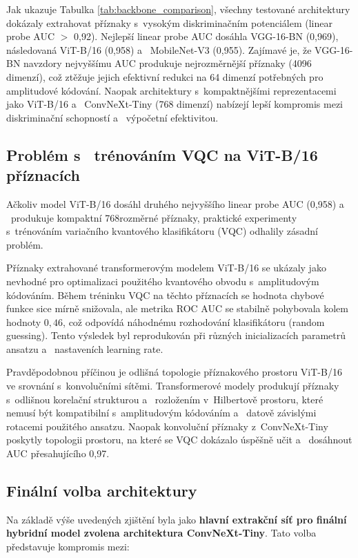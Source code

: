 \documentclass[12pt, a4paper]{report}
\begin{document}
Jak ukazuje Tabulka \ref{tab:backbone_comparison}, všechny testované architektury dokázaly extrahovat příznaky s~vysokým diskriminačním potenciálem (linear probe AUC $>$ 0,92). Nejlepší linear probe AUC dosáhla VGG-16-BN (0,969), následovaná ViT-B/16 (0,958) a ~MobileNet-V3 (0,955). Zajímavé je, že VGG-16-BN navzdory nejvyššímu AUC produkuje nejrozměrnější příznaky (4096 dimenzí), což ztěžuje jejich efektivní redukci na 64 dimenzí potřebných pro amplitudové kódování. Naopak architektury s~kompaktnějšími reprezentacemi jako ViT-B/16 a ~ConvNeXt-Tiny (768 dimenzí) nabízejí lepší kompromis mezi diskriminační schopností a ~výpočetní efektivitou.

\subsection{Problém s ~trénováním VQC na ViT-B/16 příznacích} \label{subsec:vit_vqc_failure}

Ačkoliv model ViT-B/16 dosáhl druhého nejvyššího linear probe AUC (0,958) a ~produkuje kompaktní 768rozměrné příznaky, praktické experimenty s~trénováním variačního kvantového klasifikátoru (VQC) odhalily zásadní problém.

Příznaky extrahované transformerovým modelem ViT-B/16 se ukázaly jako nevhodné pro optimalizaci použitého kvantového obvodu s~amplitudovým kódováním. Během tréninku VQC na těchto příznacích se hodnota chybové funkce sice mírně snižovala, ale metrika ROC AUC se stabilně pohybovala kolem hodnoty $0{,}46$, což odpovídá náhodnému rozhodování klasifikátoru (random guessing). Tento výsledek byl reprodukován při různých inicializacích parametrů ansatzu a ~nastaveních learning rate.

Pravděpodobnou příčinou je odlišná topologie příznakového prostoru ViT-B/16 ve srovnání s~konvolučními sítěmi. Transformerové modely produkují příznaky s~odlišnou korelační strukturou a ~rozložením v~Hilbertově prostoru, které nemusí být kompatibilní s~amplitudovým kódováním a ~datově závislými rotacemi použitého ansatzu. Naopak konvoluční příznaky z~ConvNeXt-Tiny poskytly topologii prostoru, na které se VQC dokázalo úspěšně učit a ~dosáhnout AUC přesahujícího 0,97.

\subsection{Finální volba architektury}

Na základě výše uvedených zjištění byla jako \textbf{hlavní extrakční síť pro finální hybridní model zvolena architektura ConvNeXt-Tiny}. Tato volba představuje kompromis mezi:
\end{document}
